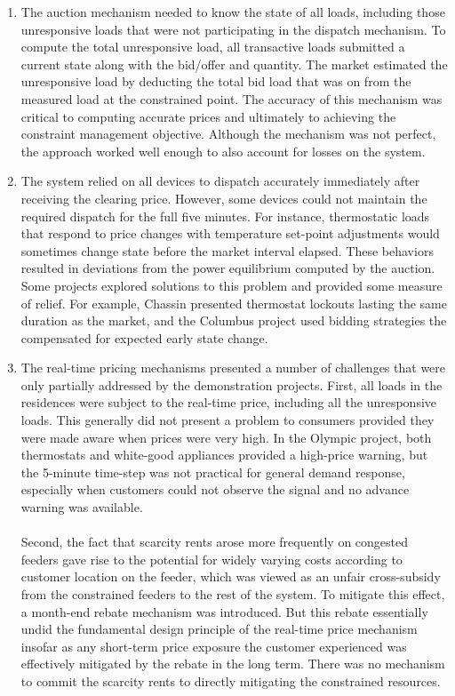 \documentclass[10pt,twocolumn]{article}
\begin{document}
\begin{enumerate}
    
    \item The auction mechanism needed to know the state of all loads, including those unresponsive loads that were not participating in the dispatch mechanism.  To compute the total unresponsive load, all transactive loads submitted a current state along with the bid/offer and quantity.  The market estimated the unresponsive load by deducting the total bid load that was on from the measured load at the constrained point.  The accuracy of this mechanism was critical to computing accurate prices and ultimately to achieving the constraint management objective.  Although the mechanism was not perfect, the approach worked well enough to also account for losses on the system.

    \item The system relied on all devices to dispatch accurately immediately after receiving the clearing price. However, some devices could not maintain the required dispatch for the full five minutes.  For instance, thermostatic loads that respond to price changes with temperature set-point adjustments would sometimes change state before the market interval elapsed. These behaviors resulted in deviations from the power equilibrium computed by the auction. Some projects explored solutions to this problem and provided some measure of relief.  For example, Chassin \cite{chassin2015} presented thermostat lockouts lasting the same duration as the market, and the Columbus project used bidding strategies the compensated for expected early state change.
    
    \item The real-time pricing mechanisms presented a number of challenges that were only partially addressed by the demonstration projects.  First, all loads in the residences were subject to the real-time price, including all the unresponsive loads.  This generally did not present a problem to consumers provided they were made aware when prices were very high.  In the Olympic project, both thermostats and white-good appliances provided a high-price warning, but the 5-minute time-step was not practical for general demand response, especially when customers could not observe the signal and no advance warning was available.  
    \\~\\
    Second, the fact that scarcity rents arose more frequently on congested feeders gave rise to the potential for widely varying costs according to customer location on the feeder, which was viewed as an unfair cross-subsidy from the constrained feeders to the rest of the system.  To mitigate this effect, a month-end rebate mechanism was introduced. But this rebate essentially undid the fundamental design principle of the real-time price mechanism insofar as any short-term price exposure the customer experienced was effectively mitigated by the rebate in the long term. There was no mechanism to commit the scarcity rents to directly mitigating the constrained resources.
    
\end{enumerate}
\end{document}
